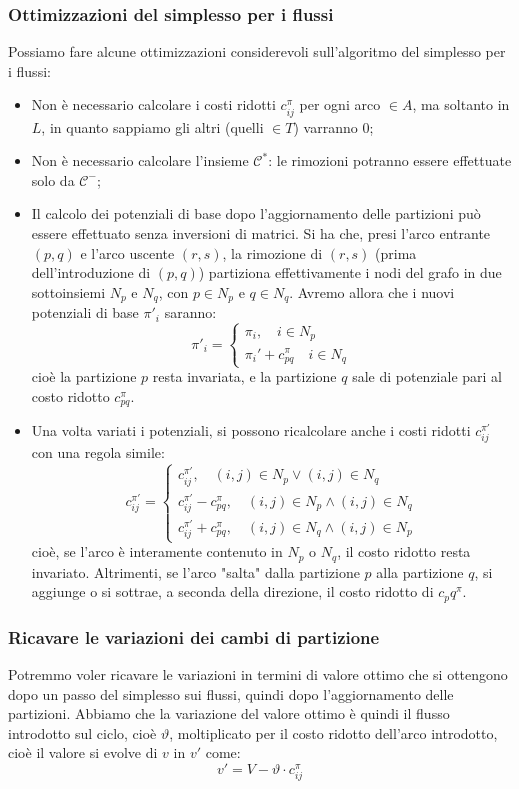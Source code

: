 \documentclass[a4paper,11pt]{article}
\begin{document}
\subsubsection{Ottimizzazioni del simplesso per i flussi}
Possiamo fare alcune ottimizzazioni considerevoli sull'algoritmo del simplesso per i flussi:
\begin{itemize}
	\item Non è necessario calcolare i costi ridotti $c^\pi_{ij}$ per ogni arco $\in A$, ma soltanto in $L$, in quanto sappiamo gli altri (quelli $\in T$) varranno 0;
	\item Non è necessario calcolare l'insieme $\mathcal{C}^*$: le rimozioni potranno essere effettuate solo da $\mathcal{C}^-$;
	\item Il calcolo dei potenziali di base dopo l'aggiornamento delle partizioni può essere effettuato senza inversioni di matrici.
		Si ha che, presi l'arco entrante $(p, q)$ e l'arco uscente $(r, s)$, la rimozione di $(r,s)$ (prima dell'introduzione di $(p,q)$) partiziona effettivamente i nodi del grafo in due sottoinsiemi $N_p$ e $N_q$, con $p \in N_p$ e $q \in N_q$.
		Avremo allora che i nuovi potenziali di base $\pi'_i$ saranno:
		\[
			\pi'_i =
			\begin{cases}
				\pi_i, \quad i \in N_p \\ 
				\pi_i'+ c_{pq}^\pi \quad i \in N_q
			\end{cases}
		\]
		cioè la partizione $p$ resta invariata, e la partizione $q$ sale di potenziale pari al costo ridotto $c^\pi_{pq}$.
	\item Una volta variati i potenziali, si possono ricalcolare anche i costi ridotti $c_{ij}^{\pi'}$ con una regola simile:
		\[
			c_{ij}^{\pi'} =
			\begin{cases}
				c_{ij}^{\pi'}, \quad (i,j) \in N_p \vee (i,j) \in N_q \\ 
				c_{ij}^{\pi'} - c_{pq}^\pi, \quad (i,j) \in N_p \wedge (i,j) \in N_q \\ 
				c_{ij}^{\pi'} + c_{pq}^\pi, \quad (i,j) \in N_q \wedge (i,j) \in N_p
			\end{cases}
		\]
		cioè, se l'arco è interamente contenuto in $N_p$ o $N_q$, il costo ridotto resta invariato.
		Altrimenti, se l'arco "salta" dalla partizione $p$ alla partizione $q$, si aggiunge o si sottrae, a seconda della direzione, il costo ridotto di $c_pq^\pi$.
	\end{itemize}

\subsubsection{Ricavare le variazioni dei cambi di partizione}
Potremmo voler ricavare le variazioni in termini di valore ottimo che si ottengono dopo un passo del simplesso sui flussi, quindi dopo l'aggiornamento delle partizioni.
Abbiamo che la variazione del valore ottimo è quindi il flusso introdotto sul ciclo, cioè $\vartheta$, moltiplicato per il costo ridotto dell'arco introdotto, cioè il valore si evolve di $v$ in $v'$ come:
$$
v' = V - \vartheta \cdot c_{ij}^\pi
$$
\end{document}
